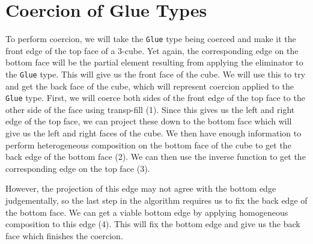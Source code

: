 \documentclass[11pt]{article}
\newcommand{\unglue}{\ensuremath{\texttt{unglue}}}
\newcommand{\hcomp}{\ensuremath{\textnormal{hcomp}}}
\begin{document}
\section{Coercion of Glue Types}
To perform coercion, we will take the \texttt{Glue} type being coerced and make it the front edge of the top face of a 3-cube. Yet again, the corresponding edge on the bottom face will be the partial element resulting from applying the eliminator to the \texttt{Glue} type. This will give us the front face of the cube. We will use this to try and get the back face of the cube, which will represent coercion applied to the \texttt{Glue} type. First, we will coerce both sides of the front edge of the top face to the other side of the face using transp-fill (1). Since this gives us the left and right edge of the top face, we can project these down to the bottom face which will give us the left and right faces of the cube. We then have enough information to perform heterogeneous composition on the bottom face of the cube to get the back edge of the bottom face (2). We can then use the inverse function to get the corresponding edge on the top face (3). 

\begin{center}
\end{center}

However, the projection of this edge may not agree with the bottom edge judgementally, so the last step in the algorithm requires us to fix the back edge of the bottom face. We can get a viable bottom edge by applying homogeneous composition to this edge (4). This will fix the bottom edge and give us the back face which finishes the coercion. 

\begin{center}
\end{center}
\end{document}
